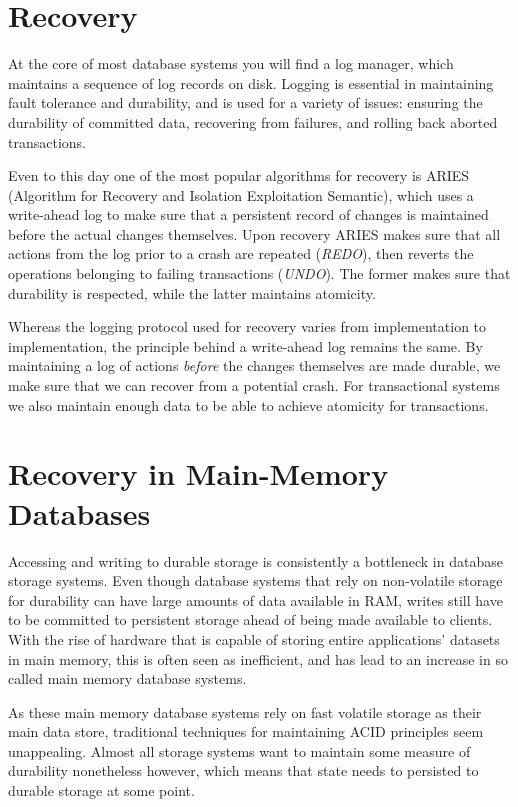 \documentclass[b5paper]{report}
\begin{document}
\section{Recovery} \label{aries}
At the core of most database systems you will find a log manager, which
maintains a sequence of log records on disk. Logging is essential in maintaining
fault tolerance and durability, and is used for a variety of issues: ensuring
the durability of committed data, recovering from failures, and rolling back
aborted transactions.

Even to this day one of the most popular algorithms for recovery is ARIES
\cite{aries} (Algorithm for Recovery and Isolation Exploitation Semantic), which
uses a write-ahead log to make sure that a persistent record of changes is
maintained before the actual changes themselves. Upon recovery ARIES makes sure
that all actions from the log prior to a crash are repeated (\textit{REDO}),
then reverts the operations belonging to failing transactions (\textit{UNDO}).
The former makes sure that durability is respected, while the latter maintains
atomicity.

Whereas the logging protocol used for recovery varies from implementation to
implementation, the principle behind a write-ahead log remains the same. By
maintaining a log of actions \textit{before} the changes themselves are made
durable, we make sure that we can recover from a potential crash. For
transactional systems we also maintain enough data to be able to achieve
atomicity for transactions.

\section{Recovery in Main-Memory Databases} \label{main-memory-recovery}
Accessing and writing to durable storage is consistently a bottleneck in
database storage systems. Even though database systems that rely on non-volatile
storage for durability can have large amounts of data available in RAM, writes
still have to be committed to persistent storage ahead of being made available
to clients. With the rise of hardware that is capable of storing entire
applications' datasets in main memory, this is often seen as inefficient,
and has lead to an increase in so called main memory database systems.

As these main memory database systems rely on fast volatile storage as their
main data store, traditional techniques for maintaining ACID principles seem
unappealing. Almost all storage systems want to maintain some measure of
durability nonetheless however, which means that state needs to persisted to
durable storage at some point.
\end{document}
